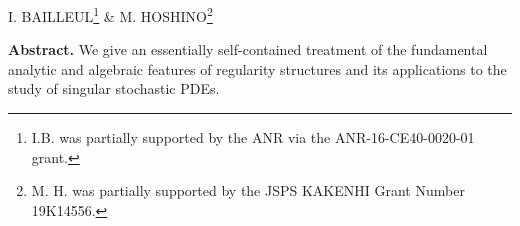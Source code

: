 \documentclass[10pt, reqno]{amsart}
\renewcommand{\baselinestretch}{0.99}
\numberwithin{subsection}{section}
\numberwithin{subsubsection}{subsection}
\numberwithin{equation}{section} %
\theoremstyle{mystyle}
\theoremstyle{mystyle2}
\theoremstyle{mystyle3}
\begin{document}
\begin{center}
{\Huge{}}
\end{center}


\begin{center}
{\sf I. BAILLEUL}\footnote{I.B. was partially supported by the ANR via the ANR-16-CE40-0020-01 grant.} \& {\sf M. HOSHINO}\footnote{M. H. was partially supported by the JSPS KAKENHI Grant Number 19K14556.}
\end{center}

\vspace{1cm}

\begin{center}
\begin{minipage}{0.8\textwidth}
\renewcommand\baselinestretch{0.7} \scriptsize \textbf{\textsf{\noindent Abstract.}} {\sf We give an essentially self-contained treatment of the fundamental analytic and algebraic features of regularity structures and its applications to the study of singular stochastic PDEs.   }
\end{minipage}
\end{center}



\vspace{0.6cm}
\end{document}
